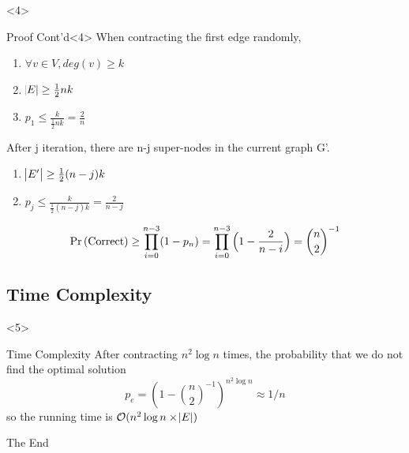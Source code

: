 \documentclass{beamer}
\begin{document}
\begin{frame}
\begin{overlayarea}{\linewidth}{\textheight}
\begin{onlyenv}
\end{onlyenv}
\begin{onlyenv}<4>
\begin{block}{Proof Cont'd}<4>
When contracting the first edge randomly,
\begin{enumerate}
	\item $\forall v \in V, deg(v)\geq k$
	\item $\abs{E}\geq \frac{1}{2}nk$
	\item $p_1\leq \frac{k}{\frac{1}{2}nk}=\frac{2}{n}$
\end{enumerate}
After j iteration, there are n-j super-nodes in the current graph G'.
\begin{enumerate}			
	\item $\abs{E'}\geq \frac{1}{2}(n-j)k$
	\item $p_j\leq \frac{k}{\frac{1}{2}(n-j)k}=\frac{2}{n-j}$
\end{enumerate}
\begin{equation*}
\Pr\left(\text{Correct}\right)\geq \prod _{i=0}^{n-3}(1-p_n) = \prod _{i=0}^{n-3}{\Bigl (}1-{\frac {2}{n-i}}{\Bigr )}={\binom n2}^{-1}
\end{equation*}
\end{block}
\end{onlyenv}
\subsection{Time Complexity}	
\begin{onlyenv}<5>
\begin{block}{Time Complexity}
After contracting $n^2\log{}n$ times, the probability that we do not find the optimal solution
\begin{equation*}
p_e = (1-{\binom n2}^{-1})^{n^2\log{}n} \approx 1/n
\end{equation*}
so the running time is $\mathcal{O}(n^2\log{}n\times \abs{E})$
\end{block}

\end{onlyenv}

\end{overlayarea}

\end{frame}



\begin{frame}
\Huge{\centerline{The End}}
\end{frame}

\end{document}

